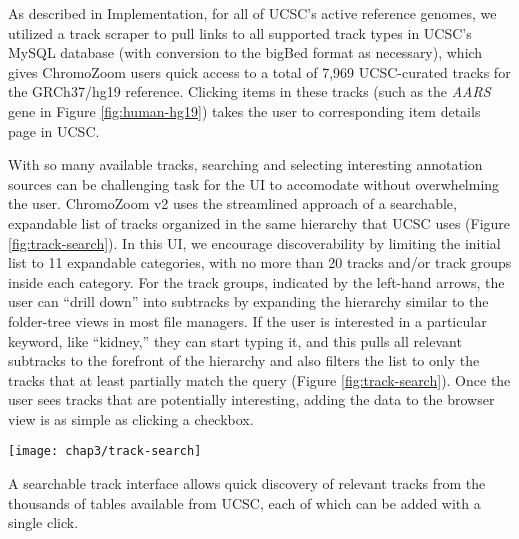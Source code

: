 As described in Implementation, for all of UCSC's active reference genomes, we utilized a track scraper to pull links to all supported track types in UCSC's MySQL database (with conversion to the bigBed format as necessary), which gives ChromoZoom users quick access to a total of 7,969 UCSC-curated tracks for the GRCh37/hg19 reference. Clicking items in these tracks (such as the \emph{AARS} gene in Figure \ref{fig:human-hg19}) takes the user to corresponding item details page in UCSC.

With so many available tracks, searching and selecting interesting annotation sources can be challenging task for the UI to accomodate without overwhelming the user. ChromoZoom v2 uses the streamlined approach of a searchable, expandable list of tracks organized in the same hierarchy that UCSC uses (Figure \ref{fig:track-search}). In this UI, we encourage discoverability by limiting the initial list to 11 expandable categories, with no more than 20 tracks and/or track groups inside each category. For the track groups, indicated by the left-hand arrows, the user can ``drill down'' into subtracks by expanding the hierarchy similar to the folder-tree views in most file managers. If the user is interested in a particular keyword, like ``kidney,'' they can start typing it, and this pulls all relevant subtracks to the forefront of the hierarchy and also filters the list to only the tracks that at least partially match the query (Figure \ref{fig:track-search}). Once the user sees tracks that are potentially interesting, adding the data to the browser view is as simple as clicking a checkbox.

\begin{marginfigure}
  \texttt{[image: chap3/track-search]}               
  \caption[Track searching interface for UCSC reference genomes.]{A searchable track interface allows quick discovery of relevant tracks from the thousands of tables available from UCSC, each of which can be added with a single click.}
  \label{fig:track-search}
\end{marginfigure}

